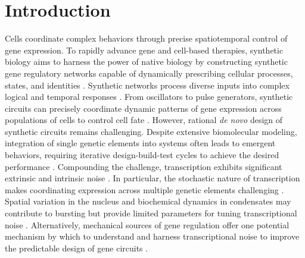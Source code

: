 \documentclass[11pt]{article}
\begin{document}
\section{Introduction}
Cells coordinate complex behaviors through precise spatiotemporal control of gene expression. To rapidly advance gene and cell-based therapies, synthetic biology aims to harness the power of native biology by constructing synthetic gene regulatory networks capable of dynamically prescribing cellular processes, states, and identities \parencite{chenSyntheticBiologyAdvancing2012,beitzSyntheticGeneCircuits2022,purnickSecondWaveSynthetic2009,elowitzBuildLifeUnderstand2010}.
Synthetic networks process diverse inputs into complex logical and temporal responses \parencite{weinbergLargescaleDesignRobust2017,xieMultiInputRNAiBasedLogic2011,taborSyntheticGeneticEdge2009}.
From oscillators to pulse generators, synthetic circuits can  precisely coordinate dynamic patterns of gene expression across populations of cells to control cell fate \parencite{gardnerConstructionGeneticToggle2000,elowitzSyntheticOscillatoryNetwork2000,strickerFastRobustTunable2008,daninoSynchronizedQuorumGenetic2010,maSyntheticMammalianSignaling2022,parkEngineeringEpigeneticRegulation2019,bashorUsingEngineeredScaffold2008,gallowayDynamicallyReshapingSignaling2013}.
However, rational \textit{de novo} design of synthetic circuits remains challenging. Despite extensive biomolecular modeling, integration of single genetic elements into systems often leads to emergent behaviors, requiring iterative design-build-test cycles to achieve the desired performance \parencite{jonesEndoribonucleasebasedFeedforwardController2020,freiCharacterizationMitigationGene2020,qianResourceCompetitionShapes2017}. Compounding the challenge, transcription exhibits significant extrinsic and intrinsic noise \parencite{toNoiseCanInduce2010,zopfCellCycleDependenceTranscription2013,desaiDNArepairPathwayCan2021}.
In particular, the stochastic nature of transcription makes coordinating expression across multiple genetic elements challenging \parencite{rodriguezIntrinsicDynamicsHuman2019,rodriguezTranscriptionLivingCells2020,quartonUncouplingGeneExpression2020}.
Spatial variation in the nucleus and biochemical dynamics in condensates may contribute to bursting but provide limited parameters for tuning transcriptional noise \parencite{henningerRNAMediatedFeedbackControl2020,guoPolIIPhosphorylation2019}.
Alternatively, mechanical sources of gene regulation offer one potential mechanism by which to understand and harness transcriptional noise to improve the predictable design of gene circuits \parencite{johnstoneEngineeringCellularSymphonies2021,anconaTranscriptionalBurstsNonequilibrium2019a,kimLongDistanceCooperativeAntagonistic2019,elhoudaiguiBacterialGenomeArchitecture2019a,meyerTorsionMediatedInteractionAdjacent2014}.
\end{document}
